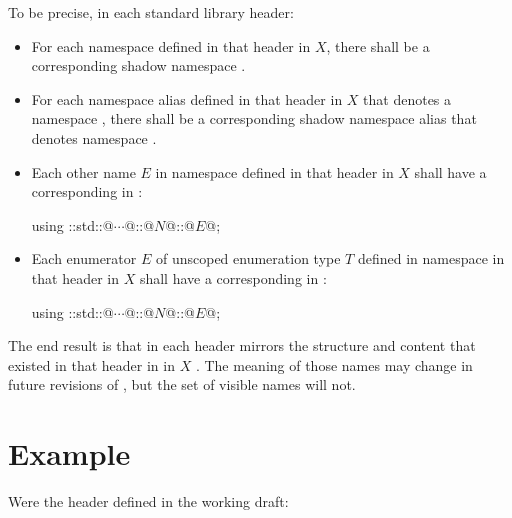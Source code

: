 To be precise, in each standard library header:
\begin{itemize}
\item For each namespace  defined in that header
   in \Cpp$X$, there shall be a corresponding shadow namespace
  .

\item For each namespace alias  defined in that
  header  in \Cpp$X$ that denotes a namespace
  , there shall be
  a corresponding shadow namespace alias
   that denotes namespace
  .

\item Each other name $E$ in namespace 
  defined in that header  in \Cpp$X$ shall have a corresponding
   in :
  \begin{codeblock}
  using ::std::@$\cdots$@::@$N$@::@$E$@;
  \end{codeblock}

\item Each enumerator $E$ of unscoped enumeration type $T$ defined in namespace
   in that header  in \Cpp$X$ shall have
  a corresponding 
  in :
  \begin{codeblock}
  using ::std::@$\cdots$@::@$N$@::@$E$@;
  \end{codeblock}
\end{itemize}
The end result is that  in each header mirrors
the structure and content that existed in that header in  in \Cpp$X$
.
The meaning of those names may change in future revisions of \Cpp, but the set
of visible names will not.

\newpage
\section{Example}

Were the header  defined in the working draft:

